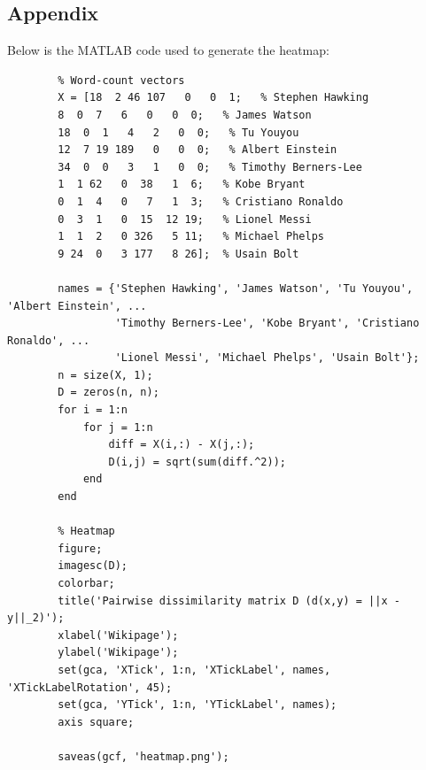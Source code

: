 \documentclass{article}
\begin{document}
    \newpage
    \subsection{Appendix}
    Below is the MATLAB code used to generate the heatmap:
    \begin{verbatim}
        % Word-count vectors
        X = [18  2 46 107   0   0  1;   % Stephen Hawking
        8  0  7   6   0   0  0;   % James Watson
        18  0  1   4   2   0  0;   % Tu Youyou
        12  7 19 189   0   0  0;   % Albert Einstein
        34  0  0   3   1   0  0;   % Timothy Berners-Lee
        1  1 62   0  38   1  6;   % Kobe Bryant
        0  1  4   0   7   1  3;   % Cristiano Ronaldo
        0  3  1   0  15  12 19;   % Lionel Messi
        1  1  2   0 326   5 11;   % Michael Phelps
        9 24  0   3 177   8 26];  % Usain Bolt

        names = {'Stephen Hawking', 'James Watson', 'Tu Youyou', 'Albert Einstein', ...
                 'Timothy Berners-Lee', 'Kobe Bryant', 'Cristiano Ronaldo', ...
                 'Lionel Messi', 'Michael Phelps', 'Usain Bolt'};
        n = size(X, 1);
        D = zeros(n, n);
        for i = 1:n
            for j = 1:n
                diff = X(i,:) - X(j,:);
                D(i,j) = sqrt(sum(diff.^2));
            end
        end

        % Heatmap
        figure;
        imagesc(D);
        colorbar;
        title('Pairwise dissimilarity matrix D (d(x,y) = ||x - y||_2)');
        xlabel('Wikipage');
        ylabel('Wikipage');
        set(gca, 'XTick', 1:n, 'XTickLabel', names, 'XTickLabelRotation', 45);
        set(gca, 'YTick', 1:n, 'YTickLabel', names);
        axis square;

        saveas(gcf, 'heatmap.png');
    \end{verbatim}
\end{document}

